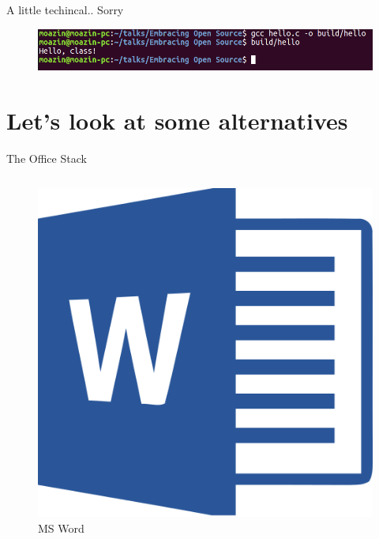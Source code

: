 \documentclass[10pt]{beamer}
\begin{document}
    \begin{frame}{A little techincal.. Sorry}
        
        \begin{figure}
            \centering
            \includegraphics[width=1\textwidth]{images/build}
        \end{figure}
    \end{frame}

    \section{Let's look at some alternatives}
    \begin{frame}{The Office Stack}
        \begin{columns}[T]
            \begin{column}{0.33\textwidth}
                \begin{figure}
                    \centering
                    \includegraphics[height=0.1\paperheight]{images/word}
                    \caption{MS Word}
                \end{figure}
                \begin{figure}

\end{figure}
\end{column}
\end{columns}
\end{frame}
\end{document}
